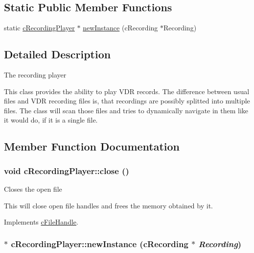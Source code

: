 \subsection*{Static Public Member Functions}
\begin{CompactItemize}
\item 
static \hyperlink{classcRecordingPlayer}{cRecordingPlayer} $\ast$ \hyperlink{classcRecordingPlayer_59abdfe4e4339943afbd713d2fb35e40}{newInstance} (cRecording $\ast$Recording)
\end{CompactItemize}


\subsection{Detailed Description}
The recording player

This class provides the ability to play VDR records. The difference between usual files and VDR recording files is, that recordings are possibly splitted into multiple files. The class will scan those files and tries to dynamically navigate in them like it would do, if it is a single file. 

\subsection{Member Function Documentation}
\hypertarget{classcRecordingPlayer_5e81aeecd16f89e432690a9b05d8dd6a}{
\subsubsection[{close}]{\setlength{\rightskip}{0pt plus 5cm}void cRecordingPlayer::close ()}}
\label{classcRecordingPlayer_5e81aeecd16f89e432690a9b05d8dd6a}


Closes the open file

This will close open file handles and frees the memory obtained by it. 

Implements \hyperlink{classcFileHandle_d7eaed7d254a64c85a48c3968238b93d}{cFileHandle}.\hypertarget{classcRecordingPlayer_59abdfe4e4339943afbd713d2fb35e40}{
\subsubsection[{newInstance}]{ $\ast$ cRecordingPlayer::newInstance (cRecording $\ast$ {\em Recording})}}
\label{classcRecordingPlayer_59abdfe4e4339943afbd713d2fb35e40}


